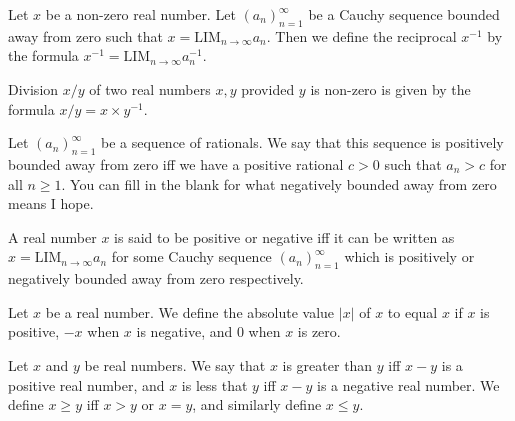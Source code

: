 \documentclass[nobib,notoc]{tufte-handout}
\begin{document}
\begin{defi}
	Let \(x\) be a non-zero real number. Let \((a_n)_{n=1}^{\infty}\) be a Cauchy sequence bounded away from zero such that \(x=\text{LIM}_{n\rightarrow\infty}a_n\). Then we define the reciprocal \(x^{-1}\) by the formula \(x^{-1}=\text{LIM}_{n\rightarrow\infty}a_n^{-1}\).
\end{defi}
\begin{defi}
	Division \(x/y\) of two real numbers \(x,y\) provided \(y\) is non-zero is given by the formula \(x/y=x\times y^{-1}\).
\end{defi}
\begin{defi}
	Let \((a_n)_{n=1}^{\infty}\) be a sequence of rationals. We say that this sequence is positively bounded away from zero iff we have a positive rational \(c>0\) such that \(a_n>c\) for all \(n\geq 1\). You can fill in the blank for what negatively bounded away from zero means I hope.
\end{defi}
\begin{defi}
	A real number \(x\) is said to be positive or negative iff it can be written as \(x=\text{LIM}_{n\rightarrow\infty}a_n\) for some Cauchy sequence \((a_n)_{n=1}^{\infty}\) which is positively or negatively bounded away from zero respectively.
\end{defi}
\begin{defi}
	Let \(x\) be a real number. We define the absolute value \(\lvert x\rvert\) of \(x\) to equal \(x\) if \(x\) is positive, \(-x\) when \(x\) is negative, and \(0\) when \(x\) is zero.
\end{defi}
\begin{defi}
	Let \(x\) and \(y\) be real numbers. We say that \(x\) is greater than \(y\) iff \(x-y\) is a positive real number, and \(x\) is less that \(y\) iff \(x-y\) is a negative real number. We define \(x\geq y\) iff \(x>y\) or \(x=y\), and similarly define \(x\leq y\).
\end{defi}
\end{document}
